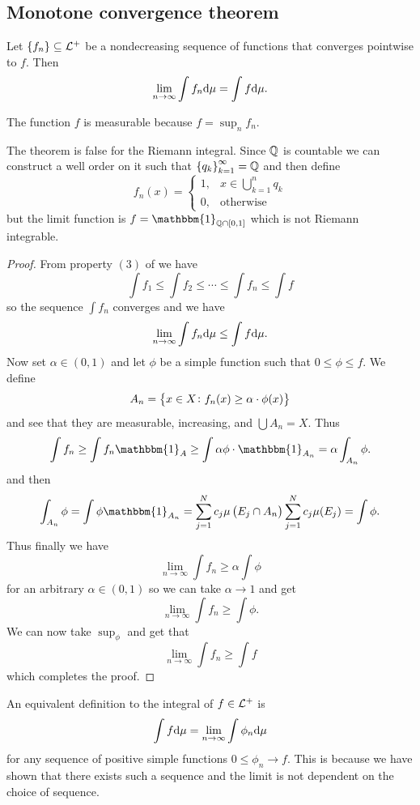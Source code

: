 \documentclass[11pt,a4paper]{article}
\begin{document}
\subsection{Monotone convergence theorem}
\begin{theorem}
  Let $\left\{f_n\right\} \subseteq \mathcal{L}^+$ be a nondecreasing sequence of functions
  that converges pointwise to $f$.
  Then
  \[
    \lim_{n \to \infty} \int f_n \mathrm{d} \mu = \int f \mathrm{d} \mu.
  \]
\end{theorem}
\begin{remark}
  The function $f$ is measurable because $f = \sup_{n} f_n$.
\end{remark}
\begin{remark}
  The theorem is false for the Riemann integral.
  Since $\mathbb{Q}$ is countable we can construct a well order on it such that
  $\left\{q_k\right\}_{k=1}^{\infty} = \mathbb{Q}$ and then define
  \[
    f_n(x) = \begin{cases}
      1, &x\in \bigcup_{k=1}^{n} q_k \\
      0, &\text{otherwise}
    \end{cases}
  \]
  but the limit function is $f = \mathbbm{1}_{\Q \cap [0,1]}$ which is not
  Riemann integrable.
\end{remark}
\begin{proof}
  From property $(3)$ of 
  we have
  \[
    \int f_1 \le \int f_2 \le \cdots \le \int f_n \le \int f
  \]
  so the sequence $\int f_n$ converges and we have
  \[
    \lim_{n \to \infty} \int f_n \mathrm{d} \mu \le \int f \mathrm{d} \mu.
  \]
  Now set $\alpha \in (0,1)$ and let $\phi$ be a simple function such that
  $0 \le \phi \le f$.
  We define
  \[
    A_n =\left\{x \in X \colon f_n(x) \geq \alpha \cdot \phi(x)\right\}
  \]
  and see that they are measurable, increasing, and $\bigcup A_n = X$.
  Thus
  \[
    \int f_n \geq
    \int f_n \mathbbm{1}_{A} \geq
    \int \alpha \phi \cdot \mathbbm{1}_{A_n} =
    \alpha \int_{A_n} \phi.
  \]
  and then
  \[
    \int_{A_n} \phi =
    \int \phi \mathbbm{1}_{A_n} =
    \sum_{j=1}^{N} c_j \mu\del{E_j \cap A_n} %
    \sum_{j=1}^{N} c_j \mu(E_j) = \int \phi.
  \]
  Thus finally we have
  \[
    \lim_{n \to \infty} \int f_n \geq \alpha \int \phi
  \]
  for an arbitrary $\alpha \in (0,1)$ so we can take $\alpha \to 1$
  and get
  \[
    \lim_{n \to \infty} \int f_n \geq \int \phi.
  \]
  We can now take $\sup_{\phi}$ and get that
  \[
    \lim_{n \to \infty} \int f_n \geq \int f
  \]
  which completes the proof.
\end{proof}
\begin{corollary}
  An equivalent definition to the integral of $f \in \mathcal{L}^+$ is
  \[
    \int f \mathrm{d} \mu = \lim_{n \to \infty} \int \phi_n \mathrm{d} \mu
  \]
  for any sequence of positive simple functions $0 \le \phi_n \to f$.
  This is because we have shown that there exists such a sequence and the
  limit is not dependent on the choice of sequence.
\end{corollary}
\end{document}
